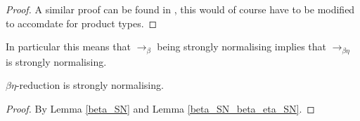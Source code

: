 \begin{proof}
    A similar proof can be found in \cite[Corollary 15.1.5]{barendregt1984lambda}, this would of course have to be modified to accomdate for product types.
\end{proof}

\begin{comment}
Now we need a small technical lemma that will show the utility of being strongly normalising.

\begin{lemma}
    If there is an infinite $\beta \eta$-reduction sequence starting from $M$, then there is an infinite $\beta$-reduction sequence starting from $M$.
\end{lemma}

\begin{proof}
    [[TODO]]
\end{proof}

We are interested in the contrapositive form of this lemma:

\begin{cor}
    If there is no infinite $\beta$-reduction sequence starting from $M$, then there is no infinite $\beta \eta$-reduction sequence starting from $M$.
\end{cor}
\end{comment}

\begin{remark}
    In particular this means that $\to_{\beta}$ being strongly normalising implies that $\to_{\beta \eta}$ is strongly normalising.
\end{remark}

\begin{cor}
    $\beta \eta$-reduction is strongly normalising.
\end{cor}

\begin{proof}
    By Lemma \ref{beta_SN} and Lemma \ref{beta_SN_beta_eta_SN}.
\end{proof}

\begin{comment}
\begin{lemma}
    $\beta \eta$-reduction is WCR.
\end{lemma}

\begin{proof}
    [[TODO]]
\end{proof}

\end{comment}

